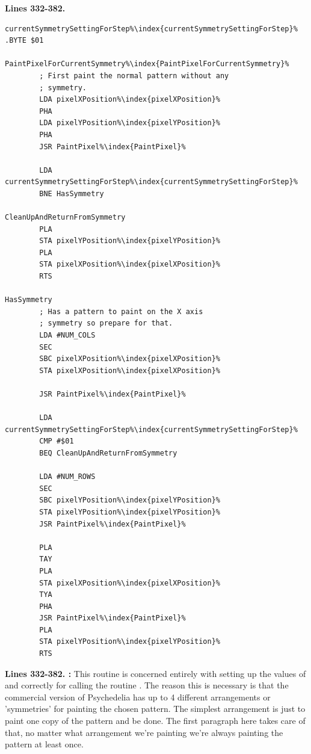 \clearpage
\textbf{Lines 332-382. }
\begin{lstlisting}[caption=Choosing what to paint based on the current symmetry setting.,escapechar=\%]
currentSymmetrySettingForStep%\index{currentSymmetrySettingForStep}%   .BYTE $01

PaintPixelForCurrentSymmetry%\index{PaintPixelForCurrentSymmetry}%   
        ; First paint the normal pattern without any
        ; symmetry.
        LDA pixelXPosition%\index{pixelXPosition}%
        PHA 
        LDA pixelYPosition%\index{pixelYPosition}%
        PHA 
        JSR PaintPixel%\index{PaintPixel}%

        LDA currentSymmetrySettingForStep%\index{currentSymmetrySettingForStep}%
        BNE HasSymmetry

CleanUpAndReturnFromSymmetry   
        PLA 
        STA pixelYPosition%\index{pixelYPosition}%
        PLA 
        STA pixelXPosition%\index{pixelXPosition}%
        RTS 

HasSymmetry   
        ; Has a pattern to paint on the X axis
        ; symmetry so prepare for that.
        LDA #NUM_COLS
        SEC 
        SBC pixelXPosition%\index{pixelXPosition}%
        STA pixelXPosition%\index{pixelXPosition}%

        JSR PaintPixel%\index{PaintPixel}%

        LDA currentSymmetrySettingForStep%\index{currentSymmetrySettingForStep}%
        CMP #$01
        BEQ CleanUpAndReturnFromSymmetry

        LDA #NUM_ROWS
        SEC 
        SBC pixelYPosition%\index{pixelYPosition}%
        STA pixelYPosition%\index{pixelYPosition}%
        JSR PaintPixel%\index{PaintPixel}%

        PLA 
        TAY 
        PLA 
        STA pixelXPosition%\index{pixelXPosition}%
        TYA 
        PHA 
        JSR PaintPixel%\index{PaintPixel}%
        PLA 
        STA pixelYPosition%\index{pixelYPosition}%
        RTS 

\end{lstlisting}
\clearpage

\textbf{Lines 332-382. :} This routine is concerned entirely with setting up the values of  and  correctly
for calling the routine . The reason this is necessary is that the commercial version of Psychedelia
has up to 4 different arrangements or 'symmetries' for painting the chosen pattern. The simplest arrangement is just to 
paint one copy of the pattern and be done. The first paragraph here takes care of that, no matter what arrangement we're
painting we're always painting the pattern at least once. 

